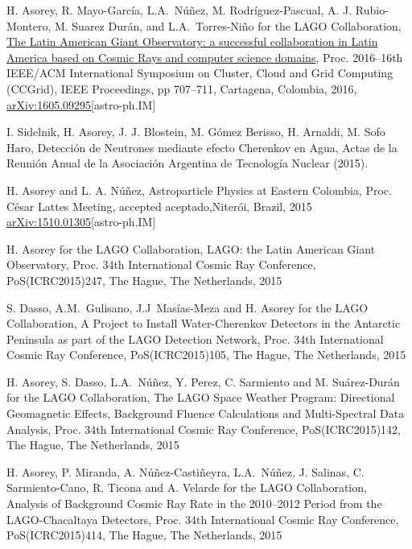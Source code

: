\begin{etaremune}
\item {} H. Asorey, R. Mayo-García, L.A.\ Núñez, M. Rodríguez-Pascual, A. J. Rubio-Montero, M. Suarez Durán, and L.A.\ Torres-Niño for the LAGO Collaboration, {{\href{http://dx.doi.org/10.1109/CCGrid.2016.110}{The Latin American Giant Observatory: a successful collaboration in Latin America based on Cosmic Rays and computer science domains}}}, \en Proc.
2016--16th IEEE/ACM International Symposium on Cluster, Cloud and Grid Computing (CCGrid), IEEE Proceedings, pp 707--711, Cartagena, Colombia, 2016, \href{http://arxiv.org/abs/1605.09295}{arXiv:1605.09295}[astro-ph.IM]

\item {} I. Sidelnik, H. Asorey, J. J. Blostein, M. Gómez Berisso, H. Arnaldi, M. Sofo Haro, {{Detección de Neutrones mediante efecto Cherenkov en Agua}}, Actas de la Reunión Anual de la Asociación Argentina de Tecnología Nuclear (2015).

\item {}H. Asorey and L. A. Núñez, {{Astroparticle Physics at Eastern Colombia}}, \en Proc.
César Lattes Meeting, \ifeng accepted \else aceptado,\fi Niterói, Brazil, 2015 \href{http://arxiv.org/abs/1510.01305}{arXiv:1510.01305}[astro-ph.IM]

\item {}H. Asorey for the LAGO Collaboration, {{LAGO: the Latin American Giant Observatory}}, \en Proc.
34th International Cosmic Ray Conference, PoS(ICRC2015)247, The Hague, The Netherlands, 2015

\item {}S. Dasso, A.M.\ Gulisano, J.J\  Masías-Meza and H. Asorey for the LAGO Collaboration, {{A Project to Install Water-Cherenkov Detectors in the Antarctic Peninsula as part of the LAGO Detection Network}}, \en Proc.
34th International Cosmic Ray Conference, PoS(ICRC2015)105, The Hague, The Netherlands, 2015

\item {}H. Asorey, S. Dasso, L.A.\ Núñez, Y. Perez, C. Sarmiento and M. Suárez-Durán for the LAGO Collaboration, {{The LAGO Space Weather Program: Directional Geomagnetic Effects, Background Fluence Calculations and Multi-Spectral Data Analysis}}, \en Proc.
34th International Cosmic Ray Conference, PoS(ICRC2015)142, The Hague, The Netherlands, 2015

\item {}H. Asorey, P. Miranda, A. Núñez-Castiñeyra, L.A.\ Núñez, J. Salinas, C. Sarmiento-Cano, R. Ticona and A. Velarde for the LAGO Collaboration, {{Analysis of Background Cosmic Ray Rate in the 2010--2012 Period from the LAGO-Chacaltaya Detectors}}, \en Proc.
34th International Cosmic Ray Conference, PoS(ICRC2015)414, The Hague, The Netherlands, 2015


\end{etaremune}
